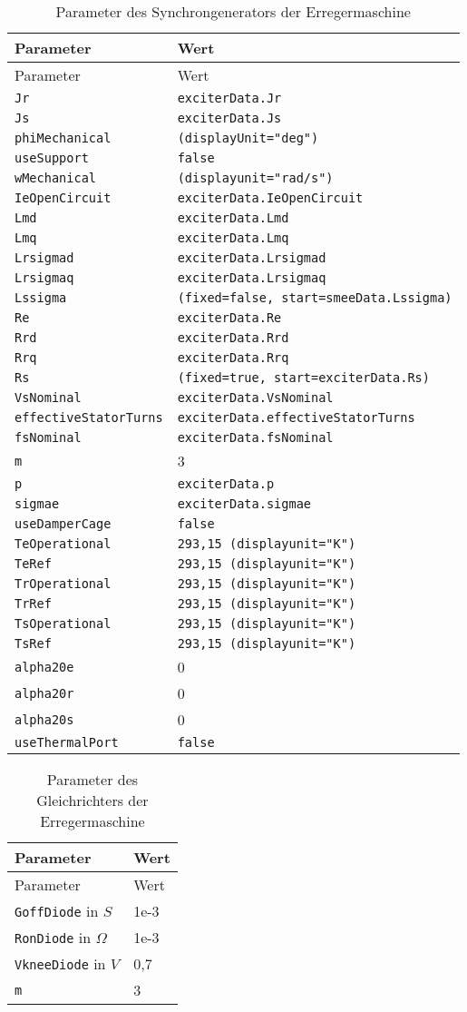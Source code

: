 \begin{longtable}[]{@{}ll@{}}
\caption{Parameter des Synchrongenerators der Erregermaschine} \label{tab:ParameterErregermaschine}
\tabularnewline
\toprule
Parameter & Wert\tabularnewline
\midrule
\endfirsthead
\toprule
Parameter & Wert\tabularnewline
\midrule
\endhead
\texttt{Jr} & \texttt{exciterData.Jr}\tabularnewline
\texttt{Js} & \texttt{exciterData.Js}\tabularnewline
\texttt{phiMechanical} & \texttt{(displayUnit="deg")}\tabularnewline
\texttt{useSupport} & \texttt{false}\tabularnewline
\texttt{wMechanical} & \texttt{(displayunit="rad/s")}\tabularnewline
\texttt{IeOpenCircuit} &
\texttt{exciterData.IeOpenCircuit}\tabularnewline
\texttt{Lmd} & \texttt{exciterData.Lmd}\tabularnewline
\texttt{Lmq} & \texttt{exciterData.Lmq}\tabularnewline
\texttt{Lrsigmad} & \texttt{exciterData.Lrsigmad}\tabularnewline
\texttt{Lrsigmaq} & \texttt{exciterData.Lrsigmaq}\tabularnewline
\texttt{Lssigma} &
\texttt{(fixed=false,\ start=smeeData.Lssigma)}\tabularnewline
\texttt{Re} & \texttt{exciterData.Re}\tabularnewline
\texttt{Rrd} & \texttt{exciterData.Rrd}\tabularnewline
\texttt{Rrq} & \texttt{exciterData.Rrq}\tabularnewline
\texttt{Rs} &
\texttt{(fixed=true,\ start=exciterData.Rs)}\tabularnewline
\texttt{VsNominal} & \texttt{exciterData.VsNominal}\tabularnewline
\texttt{effectiveStatorTurns} &
\texttt{exciterData.effectiveStatorTurns}\tabularnewline
\texttt{fsNominal} & \texttt{exciterData.fsNominal}\tabularnewline
\texttt{m} & 3\tabularnewline
\texttt{p} & \texttt{exciterData.p}\tabularnewline
\texttt{sigmae} & \texttt{exciterData.sigmae}\tabularnewline
\texttt{useDamperCage} & \texttt{false}\tabularnewline
\texttt{TeOperational} &
\texttt{293,15\ (displayunit="K")}\tabularnewline
\texttt{TeRef} & \texttt{293,15\ (displayunit="K")}\tabularnewline
\texttt{TrOperational} &
\texttt{293,15\ (displayunit="K")}\tabularnewline
\texttt{TrRef} & \texttt{293,15\ (displayunit="K")}\tabularnewline
\texttt{TsOperational} &
\texttt{293,15\ (displayunit="K")}\tabularnewline
\texttt{TsRef} & \texttt{293,15\ (displayunit="K")}\tabularnewline
\texttt{alpha20e} & 0\tabularnewline
\texttt{alpha20r} & 0\tabularnewline
\texttt{alpha20s} & 0\tabularnewline
\texttt{useThermalPort} & \texttt{false}\tabularnewline
\bottomrule
\end{longtable}

\begin{longtable}[]{@{}ll@{}}
\caption{Parameter des Gleichrichters der
Erregermaschine}
\label{tab:GleichrichterErregermaschine}
\tabularnewline
\toprule
Parameter & Wert\tabularnewline
\midrule
\endfirsthead
\toprule
Parameter & Wert\tabularnewline
\midrule
\endhead
\texttt{GoffDiode} in $\unit{S}$     & 1e-3\tabularnewline
\texttt{RonDiode} in $\unit{\Omega}$ & 1e-3\tabularnewline
\texttt{VkneeDiode} in $\unit{V}$    & 0,7\tabularnewline
\texttt{m} & 3\tabularnewline
\bottomrule
\end{longtable}


